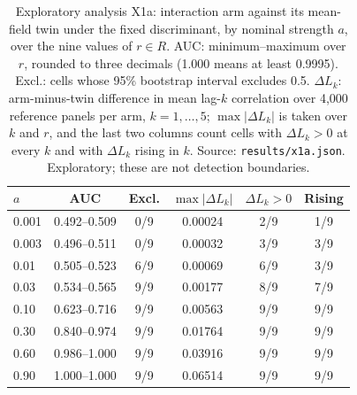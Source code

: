\begin{table}[htbp]
\centering
\footnotesize
\setlength{\tabcolsep}{3pt}
\caption{Exploratory analysis X1a: interaction arm against its mean-field twin under the fixed discriminant, by nominal strength $a$, over the nine values of $r\in R$. AUC: minimum--maximum over $r$, rounded to three decimals (1.000 means at least 0.9995). Excl.: cells whose 95\% bootstrap interval excludes 0.5. $\Delta L_k$: arm-minus-twin difference in mean lag-$k$ correlation over 4,000 reference panels per arm, $k=1,\ldots,5$; $\max|\Delta L_k|$ is taken over $k$ and $r$, and the last two columns count cells with $\Delta L_k>0$ at every $k$ and with $\Delta L_k$ rising in $k$. Source: \texttt{results/x1a.json}. Exploratory; these are not detection boundaries.}
\label{tab:supp-x1a}
\begin{tabular}{@{}lccccc@{}}
\hline
$a$ & AUC & Excl. & $\max|\Delta L_k|$ & $\Delta L_k>0$ & Rising \\
\hline
0.001 & 0.492--0.509 & 0/9 & 0.00024 & 2/9 & 1/9 \\
0.003 & 0.496--0.511 & 0/9 & 0.00032 & 3/9 & 3/9 \\
0.01 & 0.505--0.523 & 6/9 & 0.00069 & 6/9 & 3/9 \\
0.03 & 0.534--0.565 & 9/9 & 0.00177 & 8/9 & 7/9 \\
0.10 & 0.623--0.716 & 9/9 & 0.00563 & 9/9 & 9/9 \\
0.30 & 0.840--0.974 & 9/9 & 0.01764 & 9/9 & 9/9 \\
0.60 & 0.986--1.000 & 9/9 & 0.03916 & 9/9 & 9/9 \\
0.90 & 1.000--1.000 & 9/9 & 0.06514 & 9/9 & 9/9 \\
\hline
\end{tabular}
\end{table}

